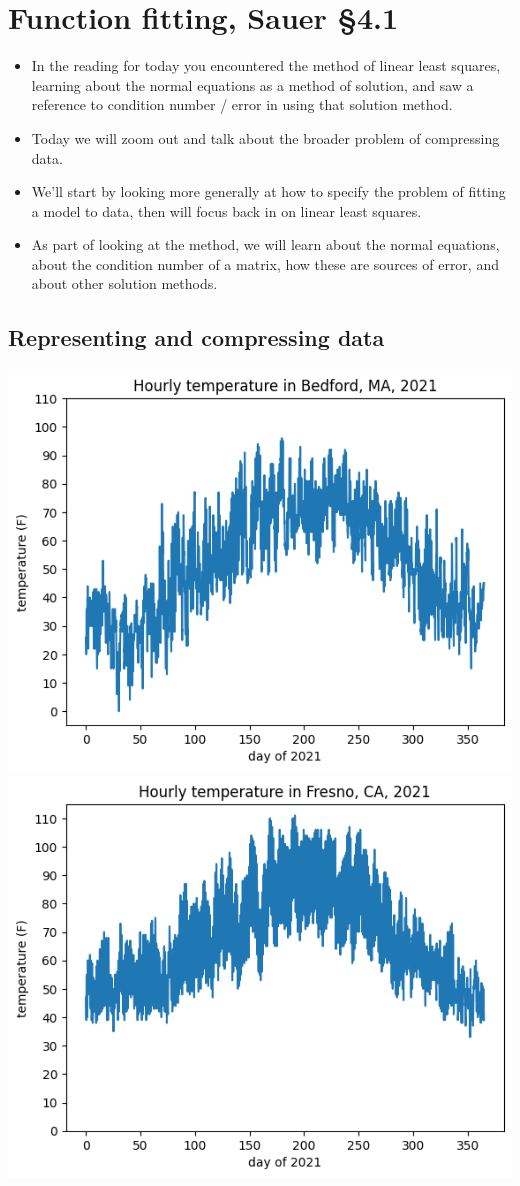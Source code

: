 \documentclass[12pt,letterpaper,noanswers]{exam}
\begin{document}
\section{Function fitting, Sauer \S 4.1}
\begin{itemize}
    \item In the reading for today you encountered the method of linear least squares, learning about the normal equations as a method of solution, and saw a reference to condition number / error in using that solution method.
    \item Today we will zoom out and talk about the broader problem of compressing data.
    \item We'll start by looking more generally at how to specify the problem of fitting a model to data, then will focus back in on linear least squares.
    \item As part of looking at the method, we will learn about the normal equations, about the condition number of a matrix, how these are sources of error, and about other solution methods.
\end{itemize}





\subsection{Representing and compressing data}

\includegraphics[width=0.45\linewidth]{img/C03weatherBedford.png}
\includegraphics[width=0.45\linewidth]{img/C03weatherFresno.png}
\end{document}
